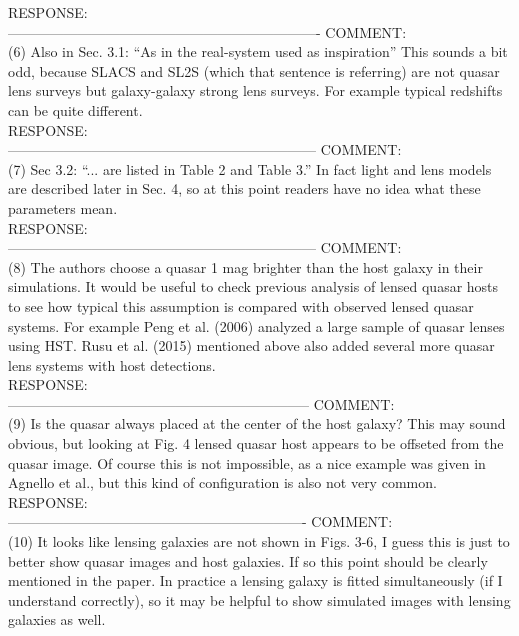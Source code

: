 \documentclass[numberedappendix,12pt,preprint]{emulateapj}
\begin{document}
RESPONSE:
\\

-------------------------------------------------------------------
COMMENT:
\\
(6) Also in Sec. 3.1: “As in the real-system used as inspiration” This sounds a bit odd, because SLACS and SL2S (which that sentence is referring) are not quasar lens surveys but galaxy-galaxy strong lens surveys. For example typical redshifts can be quite different.
\\

RESPONSE:
\\

------------------------------------------------------------------
COMMENT:
\\
(7) Sec 3.2: “... are listed in Table 2 and Table 3.” In fact light and lens models are described later in Sec. 4, so at this point readers have no idea what these parameters mean.
\\

RESPONSE:
\\

------------------------------------------------------------------
COMMENT:
\\
(8) The authors choose a quasar 1 mag brighter than the host galaxy in their simulations. It would be useful to check previous analysis of lensed quasar hosts to see how typical this assumption is compared with observed lensed quasar systems. For example Peng et al. (2006) analyzed a large sample of quasar lenses using HST. Rusu et al. (2015) mentioned above also added several more quasar lens systems with host detections.
\\

RESPONSE:
\\

-----------------------------------------------------------------
COMMENT:
\\
(9) Is the quasar always placed at the center of the host galaxy? This may sound obvious, but looking at Fig. 4 lensed quasar host appears to be offseted from the quasar image. Of course this is not impossible, as a nice example was given in Agnello et al., but this kind of configuration is also not very common.
\\

RESPONSE:
\\

----------------------------------------------------------------
COMMENT:
\\
(10) It looks like lensing galaxies are not shown in Figs. 3-6, I guess this is just to better show quasar images and host galaxies. If so this point should be clearly mentioned in the paper. In practice a lensing galaxy is fitted simultaneously (if I understand correctly), so it may be helpful to show simulated images with lensing galaxies as well.
\\
\end{document}
